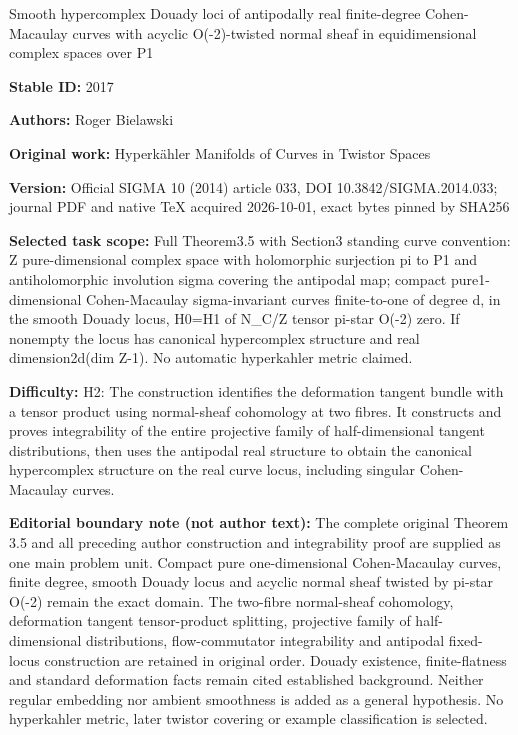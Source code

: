 \documentclass[11pt]{article}
\numberwithin{equation}{section}
\begin{document}
\begin{center}\Large Smooth hypercomplex Douady loci of antipodally real finite-degree Cohen-Macaulay curves with acyclic O(-2)-twisted normal sheaf in equidimensional complex spaces over P1\end{center}
\noindent\textbf{Stable ID:} 2017\par
\noindent\textbf{Authors:} Roger Bielawski\par
\noindent\textbf{Original work:} Hyperkähler Manifolds of Curves in Twistor Spaces\par
\noindent\textbf{Version:} Official SIGMA 10 (2014) article 033, DOI 10.3842/SIGMA.2014.033; journal PDF and native TeX acquired 2026-10-01, exact bytes pinned by SHA256\par
\noindent\textbf{Selected task scope:} Full Theorem3.5 with Section3 standing curve convention: Z pure-dimensional complex space with holomorphic surjection pi to P1 and antiholomorphic involution sigma covering the antipodal map; compact pure1-dimensional Cohen-Macaulay sigma-invariant curves finite-to-one of degree d, in the smooth Douady locus, H0=\allowbreak{}H1 of N\_C/Z tensor pi-star O(-2) zero. If nonempty the locus has canonical hypercomplex structure and real dimension2d(dim Z-1). No automatic hyperkahler metric claimed.\par
\noindent\textbf{Difficulty:} H2: The construction identifies the deformation tangent bundle with a tensor product using normal-sheaf cohomology at two fibres. It constructs and proves integrability of the entire projective family of half-dimensional tangent distributions, then uses the antipodal real structure to obtain the canonical hypercomplex structure on the real curve locus, including singular Cohen-Macaulay curves.\par
\noindent\textbf{Editorial boundary note (not author text):} The complete original Theorem 3.5 and all preceding author construction and integrability proof are supplied as one main problem unit. Compact pure one-dimensional Cohen-Macaulay curves, finite degree, smooth Douady locus and acyclic normal sheaf twisted by pi-star O(-2) remain the exact domain. The two-fibre normal-sheaf cohomology, deformation tangent tensor-product splitting, projective family of half-dimensional distributions, flow-commutator integrability and antipodal fixed-locus construction are retained in original order. Douady existence, finite-flatness and standard deformation facts remain cited established background. Neither regular embedding nor ambient smoothness is added as a general hypothesis. No hyperkahler metric, later twistor covering or example classification is selected.\par
\end{document}
